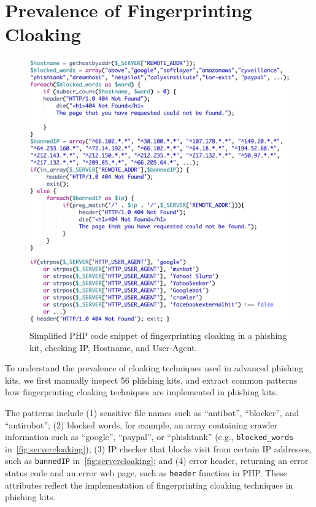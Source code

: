 \section{Prevalence of Fingerprinting Cloaking}
\label{s:prevalence}

\begin{figure}
\centering
\includegraphics[width=\linewidth]{figs/server_cloaking2.png}
\caption{Simplified PHP code snippet of fingerprinting cloaking in a phishing kit, checking IP, Hostname, and User-Agent.}
\label{fig:servercloaking}
\end{figure}

To understand the prevalence of cloaking techniques used in advanced phishing kits,
we first manually inspect 56 phishing kits, and extract common patterns how fingerprinting cloaking techniques are implemented in phishing kits.

The patterns include (1) sensitive file names such as ``antibot'', ``blocker'', and ``antirobot''; (2) blocked words, for example, an array containing crawler information such as ``google'', ``paypal'', or ``phishtank'' (e.g., \texttt{blocked\_words} in~\autoref{fig:servercloaking}); (3) IP checker that blocks visit from certain IP addresses, such as \texttt{bannedIP} in~\autoref{fig:servercloaking}; and (4) error header, returning an error status code and an error web page, such as \texttt{header} function in PHP.
These attributes reflect the implementation of fingerprinting cloaking techniques in phishing kits.

